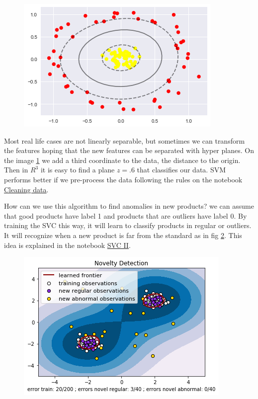 \documentclass[11pt,letterpaper]{report}
\begin{document}
\begin{figure}[h!]
	\centering
	\includegraphics[width=0.45\linewidth]{figures/svc.png}
	\caption{}
	\label{fig:kernel}
\end{figure} 
	
 Most real life cases are not linearly separable, but sometimes we can transform the features hoping that the new features can be separated  with hyper planes. On the image \ref{fig:kernel} we add a third coordinate to the data, the distance to the origin. Then in $R^3$ it is easy to find a plane $z=.6$ that classifies our data. SVM performs better if we pre-process the data following the rules on the notebook \href{ http://nbviewer.jupyter.org/mendozacortesgroup/machine_learning_class/blob/master/Lectures_Jupyter/L7_Support_Vector_Machine/Cleaning\%20data.ipynb}{Cleaning data}. 
 
How can we use this algorithm to find anomalies in new products? we can assume that good products have label 1 and products that are outliers have label 0. By training the SVC this way, it will learn to classify products in regular or outliers. It will recognize when a new product is far from the standard as in fig \ref{fig:novelty}. This idea is explained in the notebook \href{ http://nbviewer.jupyter.org/machine_learning_class/blob/master/Lectures_Jupyter/L7_Support_Vector_Machine/SVM\%2BII.ipynb}{SVC II}. 
	
	\begin{figure}[h!]
		\centering
		\includegraphics[width=0.45\linewidth]{figures/novelty.png}
		\caption{}
		\label{fig:novelty}
	\end{figure} 
	
\end{document}
